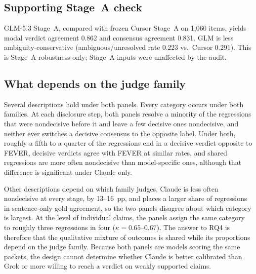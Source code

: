 \subsection{Supporting Stage~A check}
\label{sec:supporting}
GLM-5.3 Stage~A, compared with frozen Cursor Stage~A on 1{,}060 items, yields modal verdict agreement 0.862 and consensus agreement 0.831.
GLM is less ambiguity-conservative (ambiguous/unresolved rate 0.223 vs.\ Cursor 0.291).
This is Stage~A robustness only; Stage~A inputs were unaffected by the audit.

\subsection{What depends on the judge family}
\label{sec:what-replicates}
Several descriptions hold under both panels.
Every category occurs under both families.
At each disclosure step, both panels resolve a minority of the regressions that were nondecisive before it and leave a few decisive ones nondecisive, and neither ever switches a decisive consensus to the opposite label.
Under both, roughly a fifth to a quarter of the regressions end in a decisive verdict opposite to FEVER, decisive verdicts agree with FEVER at similar rates, and shared regressions are more often nondecisive than model-specific ones, although that difference is significant under Claude only.

Other descriptions depend on which family judges.
Claude is less often nondecisive at every stage, by 13--16~pp, and places a larger share of regressions in sentence-only gold agreement, so the two panels disagree about which category is largest.
At the level of individual claims, the panels assign the same category to roughly three regressions in four ($\kappa=0.65$--$0.67$).
The answer to RQ4 is therefore that the qualitative mixture of outcomes is shared while its proportions depend on the judge family.
Because both panels are models scoring the same packets, the design cannot determine whether Claude is better calibrated than Grok or more willing to reach a verdict on weakly supported claims.
